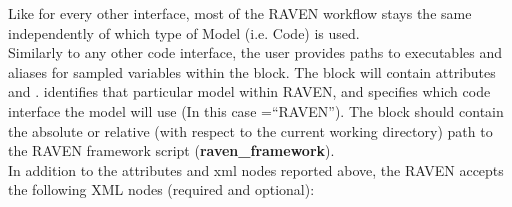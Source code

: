 Like for every other interface, most of the RAVEN workflow stays the same independently of which type of Model (i.e. Code) is used.
\\ Similarly to any other code interface, the user provides paths to executables and aliases for sampled variables within the
 block.  The  block will contain attributes  and
.   identifies that particular  model within RAVEN, and
 specifies which code interface the model will use (In this case =``RAVEN'').
The 
block should contain the absolute or relative (with respect to the current working
directory) path to the RAVEN framework script (\textbf{raven\_framework}).
\\ In addition to the attributes and xml nodes reported above, the RAVEN accepts the following XML nodes (required and optional):
